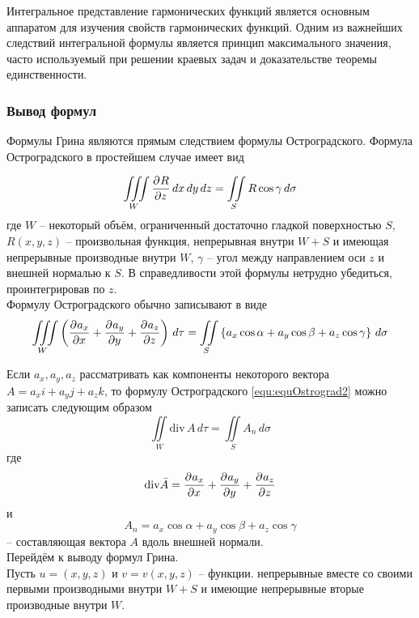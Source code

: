 Интегральное представление гармонических функций является основным аппаратом для изучения свойств гармонических функций. Одним из важнейших следствий интегральной формулы является принцип максимального значения, часто используемый при решении краевых задач и доказательстве теоремы единственности. \\

\subsubsection{Вывод формул}
Формулы Грина являются прямым следствием формулы Остроградского.
	Формула Остроградского в простейшем случае имеет вид

\begin{equation}
	\iiint\limits_W \frac{\partial^{}R}{\partial z^{}}\, dx\, dy\, dz = \iint\limits_S R \cos \gamma\, d\sigma
	\label{equ:equOstrograd}
\end{equation}
где $W$ -- некоторый объём, ограниченный достаточно гладкой поверхностью $S$, $R(x, y, z)$ -- произвольная функция, непрерывная внутри $W + S$ и имеющая непрерывные производные внутри $W$, $\gamma$ -- угол между направлением оси $z$
 и внешней нормалью к $S$. В справедливости этой формулы нетрудно убедиться, проинтегрировав по $z$.\\

    Формулу Остроградского обычно записывают в виде
\begin{equation}
	\iiint\limits_W\left( \frac{\partial^{}a_x}{\partial x^{}} + \frac{\partial^{}a_y}{\partial y^{}} + \frac{\partial^{}a_z}{\partial z^{}}\right) \, d \tau = \iint\limits_S \left\{ a_x \cos \alpha + a_y \cos \beta + a_z \cos \gamma \right\} \, d \sigma
	\label{equ:equOstrograd2}
\end{equation}

	Если $a_x, a_y, a_z$ рассматривать как компоненты некоторого вектора $A = a_x i + a_y j + a_z k$, то формулу Остроградского \eqref{equ:equOstrograd2} можно записать следующим образом
\begin{equation} 
	\iint\limits_W \mathrm{div} \, A \, d \tau = \iint\limits_S A_n \, d \sigma
	\label{equ:equOstrograd3}
\end{equation}
где
 \[
	\mathrm{div}  \bar A = \frac{\partial^{}a_x}{\partial x^{}} + \frac{\partial^{}a_y}{\partial y^{}} + \frac{\partial^{}a_z}{\partial z^{}}
\]
и
\[	
	A_n = a_x \cos \alpha + a_y \cos \beta + a_z \cos \gamma
\]
-- составляющая вектора $A$ вдоль внешней нормали.\\

Перейдём к выводу формул Грина.\\
Пусть $u = (x, y, z)$ и $v = v(x, y, z)$ -- функции. непрерывные вместе со своими первыми производными внутри $W + S$ и имеющие непрерывные вторые производные внутри $W$.


